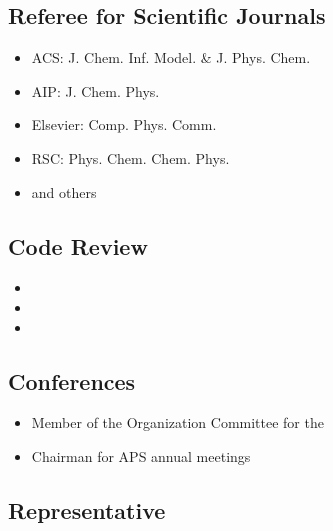 \documentclass{article}
\begin{document}
\subsection*{Referee for Scientific Journals}

\begin{itemize}
\setlength{\itemsep}{0pt}
\setlength{\parskip}{0pt}
\setlength{\parsep}{0pt}
\item ACS: J. Chem. Inf. Model. \& J. Phys. Chem.
\item AIP: J. Chem. Phys.
\item Elsevier: Comp. Phys. Comm.
\item RSC: Phys. Chem. Chem. Phys.
\item and others
\end{itemize}

\subsection*{Code Review}

\begin{itemize}
\setlength{\itemsep}{0pt}
\setlength{\parskip}{0pt}
\setlength{\parsep}{0pt}
\item {}
\item {}
\item {}
\end{itemize}

\subsection*{Conferences}

\begin{itemize}
\setlength{\itemsep}{0pt}
\setlength{\parskip}{0pt}
\setlength{\parsep}{0pt}
\item Member of the Organization Committee for the 
\item Chairman for APS annual meetings
\end{itemize}

\subsection*{Representative}
\end{document}
